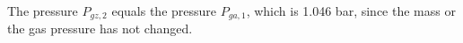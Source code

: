 The pressure \( P_{gz,2} \) equals the pressure \( P_{ga,1} \), which is 1.046 bar, since the mass or the gas pressure has not changed.